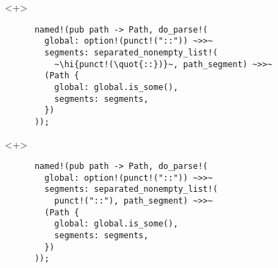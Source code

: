 \documentclass[usepdftitle=false]{beamer}
\renewcommand{\&}{\makebox[\widthof{\ampersand}][c]{\scalebox{0.9}[1.0]{\Book\ampersand}}}
\newcommand{\+}{\makebox[\widthof{+}][c]{\raisebox{-.2\height}{\scalefont{1.5}\Light+}}}
\newcommand{\hi}[1]{%
\tikz[baseline=(A.base)]
 \node[highlighting=0,inner sep=0pt,text depth=0pt] (A) {#1};%
}
\newcommand{\quot}[1]{''#1''}
\begin{document}
\begin{frame}[fragile]
\begin{onlyenv}
  \end{onlyenv}
  \begin{onlyenv}<+>
    \begin{verbatim}
      named!(pub path -> Path, do_parse!(
        global: option!(punct!("::")) ~>>~
        segments: separated_nonempty_list!(
          ~\hi{punct!(\quot{::})}~, path_segment) ~>>~
        (Path {
          global: global.is_some(),
          segments: segments,
        })
      ));
    \end{verbatim}
  \end{onlyenv}
  \begin{onlyenv}<+>
    \begin{verbatim}
      named!(pub path -> Path, do_parse!(
        global: option!(punct!("::")) ~>>~
        segments: separated_nonempty_list!(
          punct!("::"), path_segment) ~>>~
        (Path {
          global: global.is_some(),
          segments: segments,
        })
      ));
    \end{verbatim}
  \end{onlyenv}
\end{frame}
\end{document}
